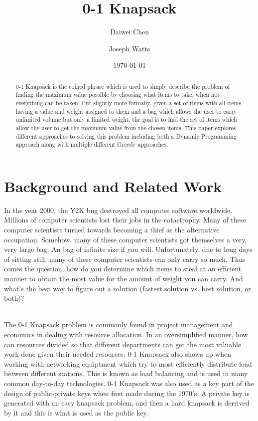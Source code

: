 \documentclass[10pt, letterpaper]{article}
\title{0-1 Knapsack}
\author{Daiwei Chen \and Joseph Watts}
\date{\today}
\begin{document}
\maketitle
\begin{abstract}
  0-1 Knapsack is the coined phrase which is used to simply describe the problem of finding the maximum value possible by choosing what items to take, when not everything can be taken.
  Put slightly more formally, given a set of items with all items having a value and weight assigned to them and a bag which allows the user to carry unlimited volume but only a limited weight, the goal is to find the set of items which allow the user to get the maximum value from the chosen items.
  This paper explores different approaches to solving this problem including both a Dynamic Programming approach along with multiple different Greedy approaches.

\end{abstract}

\section{Background and Related Work}
In the year 2000, the Y2K bug destroyed all computer software worldwide. Millions of computer scientists lost their jobs in the catastrophy. Many of these computer scientists turned towards becoming a thief as the alternative occupation. Somehow, many of these computer scientists got themselves a very, very large bag. An bag of infinite size if you will. Unfortunately, due to long days of sitting still, many of these computer scientists can only carry so much. Thus comes the question, how do you determine which items to steal at an efficient manner to obtain the most value for the amount of weight you can carry. And what's the best way to figure out a solution (fastest solution vs. best solution, or both)?\\
\\

The 0-1 Knapsack problem is commonly found in project management and economics in dealing with resource allocation. In an oversimplified manner, how can resources divided so that different departments can get the most valuable work done given their needed resources.
0-1 Knapsack also shows up when working with networking equiptment which try to most efficiently distribute load between different stations.
This is known as load balancing and is used in many common day-to-day technologies.
0-1 Knapsack was also used as a key part of the design of public-private keys when first made during the 1970's. A private key is generated with an easy knapsack problem, and then a hard knapsack is derrived by it and this is what is used as the public key.
\end{document}
